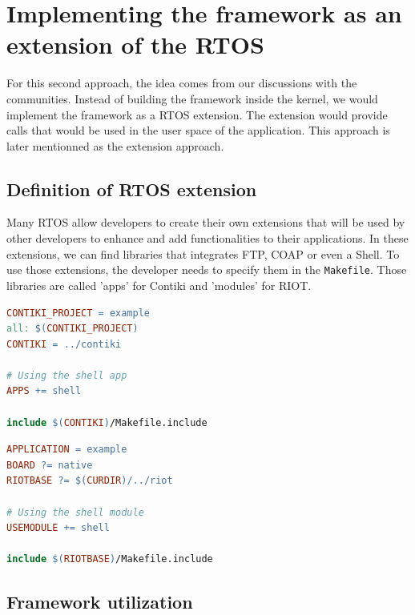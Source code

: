 \section{Implementing the framework as an extension of the RTOS \label{sec:extension}}

For this second approach, the idea comes from our discussions with the communities.
Instead of building the framework inside the kernel, we would implement the framework as a RTOS extension.
The extension would provide calls that would be used in the user space of the application.
This approach is later mentionned as the extension approach.

\subsection{Definition of RTOS extension}

Many RTOS allow developers to create their own extensions that will be used by other developers to enhance and add functionalities to their applications.
In these extensions, we can find libraries that integrates FTP, COAP or even a Shell.
To use those extensions, the developer needs to specify them in the \texttt{Makefile}.
Those libraries are called 'apps' for Contiki and 'modules' for RIOT.

\begin{minipage}{.45\textwidth}
\begin{lstlisting}[style=CStyle, language=make, caption=example of Makefile using the app \texttt{shell} with Contiki]
CONTIKI_PROJECT = example
all: $(CONTIKI_PROJECT)
CONTIKI = ../contiki

# Using the shell app
APPS += shell 

include $(CONTIKI)/Makefile.include
\end{lstlisting}
\end{minipage}\hfill
\begin{minipage}{.45\textwidth}
\begin{lstlisting}[style=CStyle, language=make, caption=example of Makefile using the module \texttt{shell} with RIOT]
APPLICATION = example
BOARD ?= native
RIOTBASE ?= $(CURDIR)/../riot

# Using the shell module
USEMODULE += shell 

include $(RIOTBASE)/Makefile.include
\end{lstlisting}
\end{minipage}

\subsection{Framework utilization}

